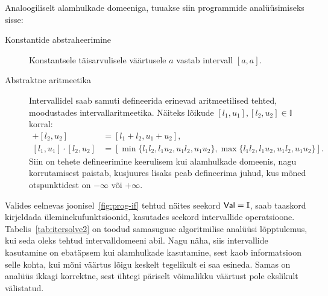 \documentclass[../thesis.tex]{subfiles}
\begin{document}
Analoogiliselt alamhulkade domeeniga, tuuakse siin programmide analüüsimiseks sisse:
\begin{description}
	\item[Konstantide abstraheerimine] Konstantsele täisarvulisele väärtusele $a$ vastab intervall $[a, a]$.

	\item[Abstraktne aritmeetika] Intervallidel saab samuti defineerida erinevad aritmeetilised tehted, moodustades intervallaritmeetika. Näiteks lõikude $[l_1, u_1], [l_2, u_2] \in \mathbb{I}$ korral:
	\begin{align*}
		[l_1, u_1] + [l_2, u_2] &= [l_1 + l_2, u_1 + u_2], \\
		[l_1, u_1] \cdot [l_2, u_2] &= [\min\{l_1l_2, l_1u_2, u_1l_2, u_1u_2\}, \max\{l_1l_2, l_1u_2, u_1l_2, u_1u_2\}].
	\end{align*}
	Siin on tehete defineerimine keerulisem kui alamhulkade domeenis, nagu korrutamisest paistab, kusjuures lisaks peab defineerima juhud, kus mõned otspunktidest on $-\infty$ või $+\infty$.
\end{description}

Valides eelnevas joonisel~\ref{fig:prog-if} tehtud näites seekord $\mathsf{Val} = \mathbb{I}$, saab taaskord kirjeldada üleminekufunktsioonid, kasutades seekord intervallide operatsioone. Tabelis~\ref{tab:itersolve2} on toodud samasuguse algoritmilise analüüsi lõpptulemus, kui seda oleks tehtud intervalldomeeni abil. Nagu näha, siis intervallide kasutamine on ebatäpsem kui alamhulkade kasutamine, sest kaob informatsioon selle kohta, kui mõni väärtus lõigu keskelt tegelikult ei saa esineda. Samas on analüüs ikkagi korrektne, sest ühtegi päriselt võimalikku väärtust pole ekslikult välistatud.
\end{document}
